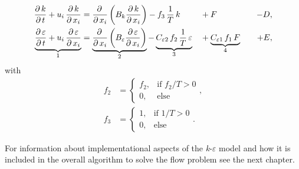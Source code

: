 \begin{alignat}{5} \label{eq:keTransport04}
		\frac{\partial\,k}{\partial\,t} + u_i\,\frac{\partial\,k}{\partial\,x_i}
		&=
		\frac{\partial\,}{\partial\,x_i}\left(  B_k \frac{\partial\,k}{\partial\,x_i} \right) 
		-
		f_3\,\frac{1}{T}\,k
		&&+
		F
		&&&-
		D, \\ \label{eq:keTransport05}
		\underbrace{\frac{\partial\,\varepsilon}{\partial\,t} + u_i\,\frac{\partial\,\varepsilon}{\partial\,x_i}}_{1}
		&=
		\underbrace{\frac{\partial\,}{\partial\,x_i}\left( B_\varepsilon \frac{\partial\,\varepsilon}{\partial\,x_i} \right)}_{2} 
		-
		\underbrace{C_{\varepsilon 2}\,f_2\,\frac{1}{T}\,\varepsilon}_{3}
		&&+
		\underbrace{C_{\varepsilon 1}\,f_1\,F}_{4}
		&&&+
		E,
\end{alignat}
\noii with
\begin{align}
	f_2&=\left\{\begin{array}{cl} f_2, & \mbox{if }f_2 / T>0 \\ 0, & \mbox{else} \end{array}\right.,
	\\
	f_3&=\left\{\begin{array}{cl} 1, & \mbox{if } 1/T>0 \\ 0, & \mbox{else} \end{array}\right..
\end{align}

\noii For information about implementational aspects of the \textit{k}-$\varepsilon$ model and how it is included in the overall algorithm to solve the flow problem see the next chapter.




